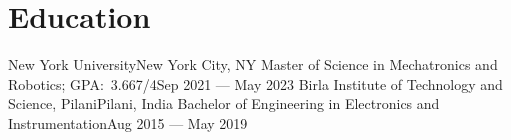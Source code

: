 \section{Education}
\resumeSubHeadingListStart
\resumeHeadingFour
{New York University}{New York City, NY}
{Master of Science in Mechatronics and Robotics;  GPA:\ 3.667/4}{Sep 2021 --- May 2023}
\resumeHeadingFour
{Birla Institute of Technology and Science, Pilani}{Pilani, India}
{Bachelor of Engineering in Electronics and Instrumentation}{Aug 2015 --- May 2019}
\resumeSubHeadingListEnd
